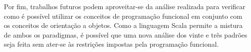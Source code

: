 
Por fim, trabalhos futuros podem aproveitar-se 
da análise realizada para verificar como 
é possível utilizar os conceitos de 
programação funcional em conjunto com os 
conceitos de orientação a objetos. Como a 
linguagem Scala permite a mistura de ambos 
os paradigmas, é possível que uma nova 
análise dos vinte e três padrões seja feita 
sem ater-se às restrições impostas pela 
programação funcional. 